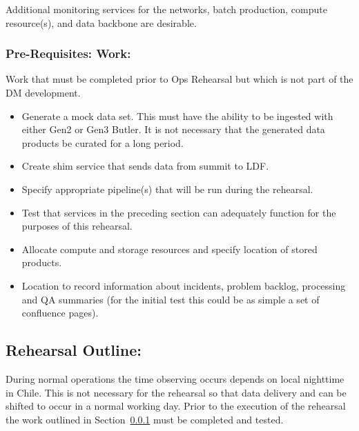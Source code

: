 Additional monitoring services for the networks, batch production, compute 
resource(s), and data backbone are desirable.

\subsubsection{Pre-Requisites: Work:}\label{prework}

Work that must be completed prior to Ops Rehearsal but which is not part of 
the DM development.
\begin{itemize}[topsep=-8pt]
\item Generate a mock data set.  This must have the ability to be ingested with 
either Gen2 or Gen3 Butler.  It is not necessary that the generated data 
products be curated for a long period.
\item Create shim service that sends data from summit to LDF.
\item Specify appropriate pipeline(s) that will be run during the rehearsal.
\item Test that services in the preceding section can adequately function 
for the purposes of this rehearsal.
\item Allocate compute and storage resources and specify location of stored 
products.
\item Location to record information about incidents, problem backlog, 
processing and QA summaries (for the initial test this could be as simple a 
set of confluence pages).
\end{itemize}


\subsection{Rehearsal Outline:}
During normal operations the time observing occurs depends on local nighttime
in Chile.  This is not necessary for the rehearsal so that data delivery and
can be shifted to occur in a normal working day.  Prior to the execution of 
the rehearsal the work outlined in Section~\ref{prework} must be completed
and tested.

